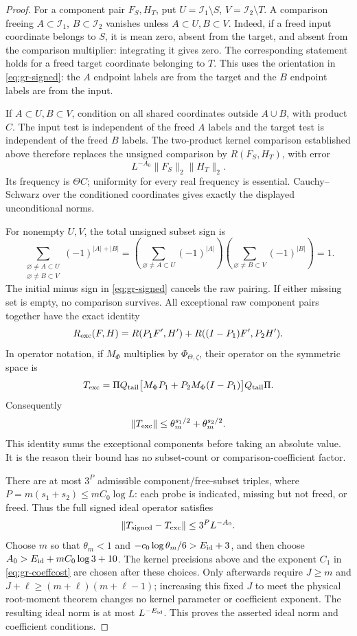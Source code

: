 \begin{proof}
For a component pair \(F_S,H_T\), put
\(U=\mathcal I_1\setminus S\), \(V=\mathcal I_2\setminus T\).
A comparison freeing \(A\subset\mathcal I_1\),
\(B\subset\mathcal I_2\) vanishes unless \(A\subset U,B\subset V\).
Indeed, if a freed input coordinate belongs to \(S\), it is
mean zero, absent from the target, and absent from the comparison
multiplier: integrating it gives zero.  The corresponding statement
holds for a freed target coordinate belonging to \(T\).
This uses the orientation in \eqref{eq:gr-signed}: the \(A\)
endpoint labels are from the target and the \(B\) endpoint labels
are from the input.

If \(A\subset U,B\subset V\), condition on all shared coordinates
outside \(A\cup B\), with product \(C\).
The input test is independent of the freed \(A\) labels and the
target test is independent of the freed \(B\) labels.
The two-product kernel comparison established above therefore
replaces the unsigned comparison by \(R(F_S,H_T)\), with error
\[
                    L^{-A_0}\|F_S\|_2\|H_T\|_2.
\]
Its frequency is \(\Theta C\); uniformity for every real frequency
is essential.  Cauchy--Schwarz over the conditioned coordinates
gives exactly the displayed unconditional norms.

For nonempty \(U,V\), the total unsigned subset sign is
\[
 \sum_{\substack{\varnothing\ne A\subset U\\
                 \varnothing\ne B\subset V}}
       (-1)^{|A|+|B|}
 =\left(\sum_{\varnothing\ne A\subset U}(-1)^{|A|}\right)
  \left(\sum_{\varnothing\ne B\subset V}(-1)^{|B|}\right)=1.
\]
The initial minus sign in \eqref{eq:gr-signed} cancels the raw
pairing.  If either missing set is empty, no comparison survives.
All exceptional raw component pairs together have the exact identity
\[
 R_{\rm exc}(F,H)=
 R(P_1F',H')+R((I-P_1)F',P_2H').
\]
In operator notation, if \(M_\Phi\) multiplies by
\(\Phi_{\Theta,\zeta}\), their operator on the symmetric space is
\[
 T_{\rm exc}=
 \Pi Q_{\rm tail}
   \big[M_\Phi P_1+P_2M_\Phi(I-P_1)\big]
                 Q_{\rm tail}\Pi .
\]
Consequently
\[
 \|T_{\rm exc}\|
       \le\theta_m^{s_1/2}+\theta_m^{s_2/2}.
\]
This identity sums the exceptional components before taking an
absolute value.  It is the reason their bound has no subset-count
or comparison-coefficient factor.

There are at most \(3^{P}\) admissible component/free-subset triples,
where \(P=m(s_1+s_2)\le mC_0\log L\): each probe is indicated,
missing but not freed, or freed.  Thus the full signed ideal
operator satisfies
\[
 \|T_{\rm signed}-T_{\rm exc}\|
           \le3^{P}L^{-A_0}.
\]
Choose \(m\) so that \(\theta_m<1\) and
\(-c_0\log\theta_m/6>E_{\rm id}+3\), and then choose
\(A_0>E_{\rm id}+mC_0\log3+10\).
The kernel precisions above and the exponent \(C_1\) in
\eqref{eq:gr-coeffcost} are chosen after these choices.
Only afterwards require \(J\ge m\) and
\(J+\ell\ge(m+\ell)(m+\ell-1)\); increasing this fixed \(J\)
to meet the physical root-moment theorem changes no kernel
parameter or coefficient exponent.
The resulting ideal norm is at most \(L^{-E_{\rm id}}\).
This proves the asserted ideal norm and coefficient conditions.
\end{proof}

